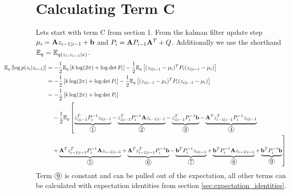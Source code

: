 \documentclass[12pt]{article}
\newcommand*\circled[1]{\tikz[baseline=(char.base)]{
    \node[shape=circle,draw,inner sep=0.8pt] (char) {#1};}}
\begin{document}
\section{Calculating Term C}
Lets start with term C from section 1. From the kalman filter update step $\mu_i = \mathbf{A} z_{i-1|i-1} + \mathbf{b}$ and $P_i = \mathbf{A} P_{i-1} \mathbf{A}^T + Q$. Additionally we use the shorthand $\mathbb{E}_q = \mathbb{E}_{q(z_i, z_{i-1} | x)}$.
\begin{align}
    \hspace*{-2cm} \E_q \left[ \log p(z_i|z_{i-1})\right] &= -\frac{1}{2} \E_q \left[ k \log (2\pi) + \log \det P_i \right] - \frac{1}{2} \E_q \left[ (z_{i|i-1} - \mu_i)^T P_i (z_{i|i-1} - \mu_i) \right] \\
    &= -\frac{1}{2} \left[ k \log (2\pi) + \log \det P_i \right] - \frac{1}{2} \E_q \left[ (z_{i|i-1} - \mu_i)^T P_i (z_{i|i-1} - \mu_i) \right] \\
    &= -\frac{1}{2} \left[ k \log (2\pi) + \log \det P_i \right] \nonumber \\
    & \quad - \frac{1}{2} \E_q \left[ \underbrace{z_{i|i-1}^T P_i^{-1} z_{i|i-1}}_{\circled{1}} - \underbrace{z_{i|i-1}^T P_i^{-1}\mA z_{i-1|i-1}}_{\circled{2}} - \underbrace{z_{i|i-1}^T P_i^{-1}\vb}_{\circled{3}} - \underbrace{\mA^Tz_{i-1|i-1}^T P_i^{-1} z_{i|i-1}}_{\circled{4}}  \right. \nonumber \\
    & \quad \left. + \underbrace{\mA^Tz_{i-1|i-1}^T P_i^{-1}\mA z_{i-1|i-1}}_{\circled{5}} + \underbrace{\mA^Tz_{i-1|i-1}^T P_{i}^{-1}\vb}_{\circled{6}} - \underbrace{\vb^T P_{i}^{-1} z_{i|i-1}}_{\circled{7}} + \underbrace{\vb^T P_{i}^{-1} \mA z_{i-1|i-1}}_{\circled{8}} + \underbrace{\vb^T P_{i}^{-1} \vb}_{\circled{9}} \right]
\end{align}
Term $\circled{9}$ is constant and can be pulled out of the expectation, all other terms can be calculated with expectation identities from section \ref{sec:expectation_identities}.
\end{document}
